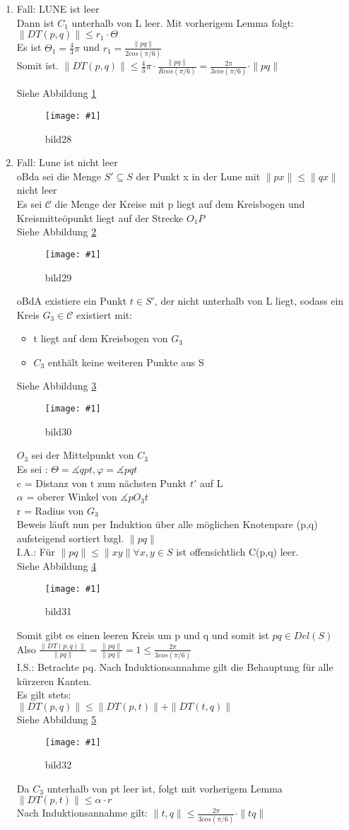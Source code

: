 \documentclass{article}
\newcommand{\bild}[4]{ %
	\begin{figure}[h!]
		\centering
		\texttt{[image: \#1]}
		\caption{#3}
		\label{#4}
	\end{figure}	
}
\newcommand{\sieheBild}[4]{
	Siehe Abbildung \ref{#4}
	\bild{#1}{#2}{#3}{#4}
}
\newcommand{\doubleAbs}[1]{
	\|#1\|
}
\begin{document}
\begin{enumerate}
	\item Fall: LUNE ist leer\\
	Dann ist $C_1$ unterhalb von L leer. Mit vorherigem Lemma folgt: \\
	$\doubleAbs{DT(p, q)} \leq r_1 \cdot \Theta$\\
	Es ist $\Theta_1 = \frac{4}{3} \pi$ und $r_1 = \frac{\doubleAbs{pq}}{2 cos(\pi / 6)}$\\
	Somit ist. $\doubleAbs{DT(p,q)} \leq \frac{4}{3} \pi \cdot \frac{\doubleAbs{pq}}{R cos(\pi / 6)} = \frac{2 \pi}{3 cos(\pi / 6)} \cdot \doubleAbs{pq}$
	\sieheBild{Bilder/28.png}{0.4}{bild28}{Bild 28}
	\item Fall: Lune ist nicht leer \\
	oBda sei die Menge $S' \subseteq S$ der Punkt x in der Lune mit $\doubleAbs{px} \leq \doubleAbs{qx}$ nicht leer\\
	Es sei $\mathscr{C}$ die Menge der Kreise mit p liegt auf dem Kreisbogen und Kreismitteöpunkt liegt auf der Strecke $O_1 P$\\
	\sieheBild{Bilder/29.png}{0.4}{bild29}{Bild 29}
	oBdA existiere ein Punkt $t \in S'$, der nicht unterhalb von L liegt, sodass ein Kreis $G_3 \in \mathscr{C}$ existiert mit: 
	\begin{itemize}
			\item t liegt auf dem Kreisbogen von $G_3$
			\item $C_3$ enthält keine weiteren Punkte aus S
	\end{itemize}
	\sieheBild{Bilder/30.png}{0.4}{bild30}{Bild 30}
	$O_3$ sei der Mittelpunkt von $C_3$\\
	Es sei : $\Theta = \measuredangle qpt, \varphi = \measuredangle pqt$\\
	c = Distanz von t zum nächsten Punkt $t'$ auf L\\
	$\alpha$ = oberer Winkel von $\measuredangle p O_3 t$\\
	r = Radius von $G_3$\\
	Beweis läuft nun per Induktion über alle möglichen Knotenpare (p,q) aufsteigend sortiert bzgl. $\doubleAbs{pq}$\\
	I.A.: Für $\doubleAbs{pq} \leq \doubleAbs{xy} \forall x, y \in S$ ist offensichtlich C(p,q) leer.\\
	\sieheBild{Bilder/31.png}{0.4}{bild31}{Bild 31}
	Somit gibt es einen leeren Kreis um p und q und somit ist $pq \in Del(S)$\\
	Also $\frac{\doubleAbs{DT(p, q)}}{\doubleAbs{pq}} = \frac{\doubleAbs{pq}}{\doubleAbs{pq}} = 1\leq \frac{2  \pi }{3 cos(\pi / 6)}$\\
	I.S.: Betrachte pq. Nach Induktionsannahme gilt die Behauptung für alle kürzeren Kanten.\\
	Es gilt stets: \\
	$\doubleAbs{DT(p, q)} \leq \doubleAbs{DT(p, t)} + \doubleAbs{DT(t, q)}$\\
	\sieheBild{Bilder/32.png}{0.4}{bild32}{Bild 32}
	Da $C_3$ unterhalb von pt leer ist, folgt mit vorherigem Lemma $\doubleAbs{DT(p, t)} \leq \alpha \cdot r$\\
	Nach Induktionsannahme gilt: $\doubleAbs{t, q} \leq \frac{2 \pi}{3 cos(\pi / 6)} \cdot \doubleAbs{tq}$
	

\end{enumerate}
\end{document}
